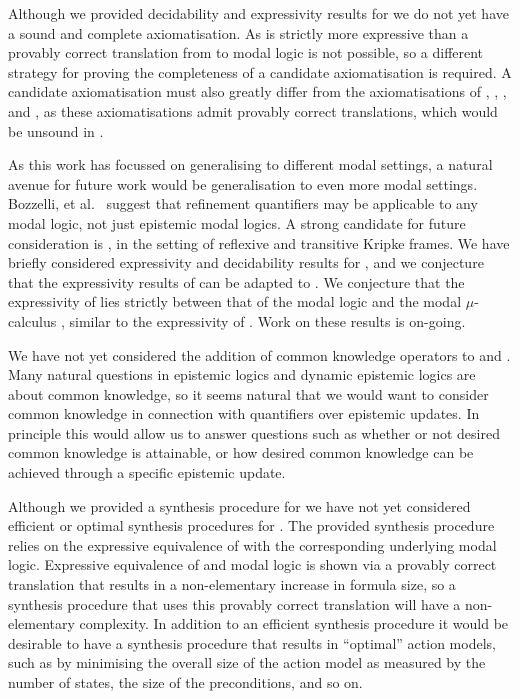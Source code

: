 Although we provided decidability and expressivity results for \logicRmlKF{} we do not yet have a sound and complete axiomatisation.
As \logicRmlKF{} is strictly more expressive than \logicKF{} a provably correct translation from \langRml{} to modal logic is not possible, so a different strategy for proving the completeness of a candidate axiomatisation is required.
A candidate axiomatisation must also greatly differ from the axiomatisations of \logicRmlK{}, \logicRmlKFF{}, \logicRmlKD{}, and \logicRmlS{}, as these axiomatisations admit provably correct translations, which would be unsound in \logicRmlKF{}.

As this work has focussed on generalising \logicRml{} to different modal settings, a natural avenue for future work would be generalisation to even more modal settings.
Bozzelli, et al.~\cite{bozzelli:2014b} suggest that refinement quantifiers may be applicable to any modal logic, not just epistemic modal logics.
A strong candidate for future consideration is \logicRmlSF{}, in the setting of reflexive and transitive Kripke frames.
We have briefly considered expressivity and decidability results for \logicRmlSF{}, and we conjecture that the expressivity results of \logicRmlKF{} can be adapted to \logicRmlSF{}.
We conjecture that the expressivity of \logicRmlSF{} lies strictly between that of the modal logic \logicSF{} and the modal $\mu$-calculus \logicMuSF{}, similar to the expressivity of \logicRmlKF{}.
Work on these results is on-going.

We have not yet considered the addition of common knowledge operators to \logicRml{} and \logicAaml{}.
Many natural questions in epistemic logics and dynamic epistemic logics are about common knowledge, so it seems natural that we would want to consider common knowledge in connection with quantifiers over epistemic updates.
In principle this would allow us to answer questions such as whether or not desired common knowledge is attainable, or how desired common knowledge can be achieved through a specific epistemic update.

Although we provided a synthesis procedure for \logicAaml{} we have not yet considered efficient or optimal synthesis procedures for \logicAaml{}.
The provided synthesis procedure relies on the expressive equivalence of \logicAaml{} with the corresponding underlying modal logic.
Expressive equivalence of \logicAaml{} and modal logic is shown via a provably correct translation that results in a non-elementary increase in formula size, so a synthesis procedure that uses this provably correct translation will have a non-elementary complexity.
In addition to an efficient synthesis procedure it would be desirable to have a synthesis procedure that results in ``optimal'' action models, such as by minimising the overall size of the action model as measured by the number of states, the size of the preconditions, and so on.

